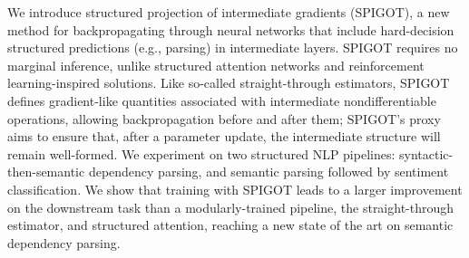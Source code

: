 We introduce structured projection of intermediate gradients (SPIGOT), a new method for backpropagating through neural networks that include hard-decision structured predictions (e.g., parsing) in intermediate layers. SPIGOT requires no marginal inference, unlike structured attention networks and reinforcement learning-inspired solutions. Like so-called straight-through estimators, SPIGOT defines gradient-like quantities associated with intermediate nondifferentiable operations, allowing backpropagation before and after them; SPIGOT's proxy aims to ensure that, after a parameter update, the intermediate structure will remain well-formed. We experiment on two structured NLP pipelines: syntactic-then-semantic dependency parsing, and semantic parsing followed by sentiment classification. We show that training with SPIGOT leads to a larger improvement on the downstream task than a modularly-trained pipeline, the straight-through estimator, and structured attention, reaching a new state of the art on semantic dependency parsing.

